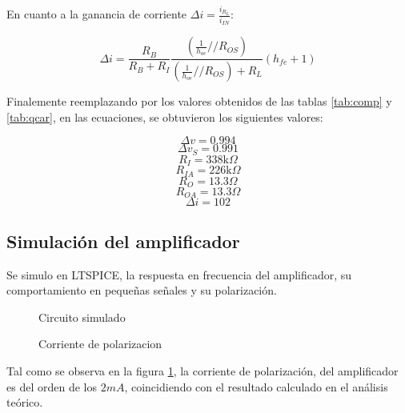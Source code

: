 \documentclass[../../main.tex]{subfiles}
\begin{document}
En cuanto a la ganancia de corriente $\Delta i=\frac{i_{R_L}}{i_{IN}}$:

\begin{equation}
\Delta i=\frac{R_B}{R_B +R_I} \frac{\left(  \frac{1}{h_{oe}} // R_{OS} \right)}{\left(  \frac{1}{h_{oe}} // R_{OS} \right) + R_L} (h_{fe} +1)
\end{equation}

Finalemente reemplazando por los valores obtenidos de las tablas \ref{tab:comp} y \ref{tab:qcar}, en las ecuaciones, se obtuvieron los siguientes valores:

$$\Delta v = 0.994$$
$$ \Delta v_S =0.991 $$
$$ R_I=338\mathrm{k}\Omega $$
$$ R_{IA} = 226\mathrm{k}\Omega $$
$$ R_O=13.3 \Omega $$
$$R_{OA}=13.3\Omega $$
$$\Delta i= 102 $$

\subsection{Simulación del amplificador}
Se simulo en LTSPICE, la respuesta en frecuencia del amplificador, su comportamiento en pequeñas señales y su polarización.

\begin{figure}[H]	
	\centering
	\caption{Circuito simulado}
\end{figure}

\begin{figure}[H]	
	\centering
	\caption{Corriente de polarizacion}\label{fig:simicq}
\end{figure}
Tal como se observa en la figura \ref{fig:simicq}, la corriente de polarización, del amplificador es del orden de los $2mA$, coincidiendo con el resultado calculado en el análisis teórico.
\end{document}
